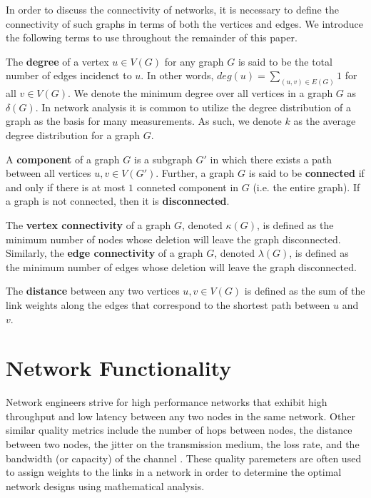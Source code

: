 \documentclass[11pt]{article}
\begin{document}
In order to discuss the connectivity of networks, it is necessary to define the connectivity of such graphs in terms of both the vertices and edges. We introduce the following terms to use throughout the remainder of this paper.

\begin{define}
The \textbf{degree} of a vertex $u \in V(G)$ for any graph $G$ is said to be the total number of edges incidenct to $u$. In other words, $deg(u) = \sum_{(u,v) \in E(G)} 1$ for all $v \in V(G)$. We denote the minimum degree over all vertices in a graph $G$ as $\delta(G)$. In network analysis it is common to utilize the degree distribution of a graph as the basis for many measurements. As such, we denote $k$ as the average degree distribution for a graph $G$.
\end{define}

\begin{define}
A \textbf{component} of a graph $G$ is a subgraph $G'$ in which there exists a path between all vertices $u, v \in V(G')$. Further, a graph $G$ is said to be \textbf{connected} if and only if there is at most $1$ conneted component in $G$ (i.e. the entire graph). If a graph is not connected, then it is \textbf{disconnected}.
\end{define}

\begin{define}
The \textbf{vertex connectivity} of a graph $G$, denoted $\kappa(G)$, is defined as the minimum number of nodes whose deletion will leave the graph disconnected. Similarly, the \textbf{edge connectivity} of a graph $G$, denoted $\lambda(G)$, is defined as the minimum number of edges whose deletion will leave the graph disconnected.
\end{define}

\begin{define}
The \textbf{distance} between any two vertices $u, v \in V(G)$ is defined as the sum of the link weights along the edges that correspond to the shortest path between $u$ and $v$.
\end{define}

\section{Network Functionality}
\label{NetworkFunctionality}

Network engineers strive for high performance networks that exhibit high throughput and low latency between any two nodes in the same network. Other similar quality metrics include the number of hops between nodes, the distance between two nodes, the jitter on the transmission medium, the loss rate, and the bandwidth (or capacity) of the channel \cite{LargeNetworkRobustness-PVM}. These quality paremeters are often used to assign weights to the links in a network in order to determine the optimal network designs using mathematical analysis. 
\end{document}
